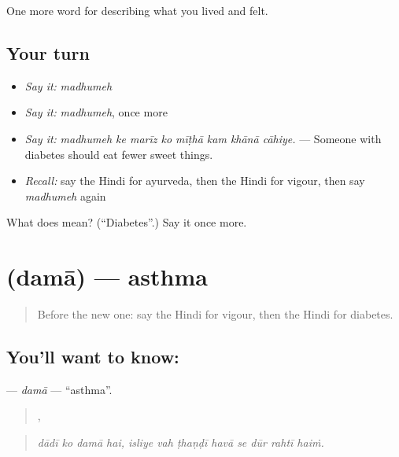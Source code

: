 \begin{grammarlens}[title={What you've built}]
One more word for describing what you lived and felt.
\end{grammarlens}

\subsection*{Your turn}
\begin{itemize}
\raggedright
  \item \emph{Say it:} \emph{madhumeh}
  \item \emph{Say it:} \emph{madhumeh}, once more
  \item \emph{Say it:} \emph{madhumeh ke marīz ko mīṭhā kam khānā cāhiye.} — Someone with diabetes should eat fewer sweet things.
  \item \emph{Recall:} say the Hindi for ayurveda, then the Hindi for vigour, then say \emph{madhumeh} again
\end{itemize}

\begin{tcolorbox}[breakable,colback=teal!4,colframe=teal!35!black,title={Before you move on}]
What does  mean? (\textquotedblleft{}Diabetes\textquotedblright{}.) Say it once more.
\end{tcolorbox}
\section[\texorpdfstring{\hi{दमा} (damā)}{दमा (damā)}]{ (damā) — asthma}

\label{lesson:HI-C493-dama}



\begin{quote}
Before the new one: say the Hindi for vigour, then the Hindi for diabetes.
\end{quote}

\subsection*{You'll want to know: }
\textbf{} — \emph{damā} — \textquotedblleft{}asthma\textquotedblright{}.

\begin{quote}
   ,        
\end{quote}

\begin{quote}
\emph{dādī ko damā hai, isliye vah ṭhaṇḍī havā se dūr rahtī haiṁ.}
\end{quote}


